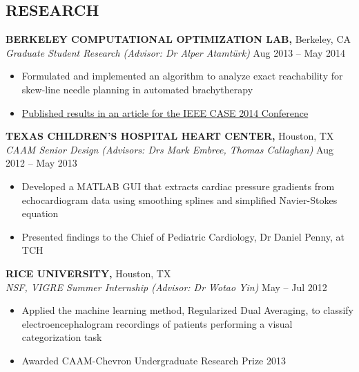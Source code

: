 \documentclass[margin]{res}
\begin{document}
\begin{resume}
\section{RESEARCH}
{\bf BERKELEY COMPUTATIONAL OPTIMIZATION LAB,} Berkeley, CA \\
{\em Graduate Student Research (Advisor: Dr Alper Atamt\"urk)} \hfill
Aug 2013 -- May 2014 \\                                          \vspace{-4mm}
\begin{itemize}                                         \itemsep1pt %
        \item    Formulated and implemented an algorithm to analyze exact reachability for skew-line needle planning in automated brachytherapy
        \item    \href{http://www.decf.berkeley.edu/~gyang/paper2014.pdf}{Published results in an article for the IEEE CASE 2014 Conference}
\end{itemize}
\vspace{-2mm}

{\bf TEXAS CHILDREN'S HOSPITAL HEART CENTER,} Houston, TX \\
{\em CAAM Senior Design (Advisors: Drs Mark Embree, Thomas Callaghan)} \hfill
Aug 2012 -- May 2013 \\                                          \vspace{-4mm}
\begin{itemize}                                         \itemsep1pt %
        \item  Developed a MATLAB GUI that extracts cardiac pressure gradients from echocardiogram data using smoothing splines and simplified Navier-Stokes equation 
        \item  Presented findings to the Chief of Pediatric Cardiology, Dr Daniel Penny, at TCH
\end{itemize}
\vspace{-2mm}

{\bf RICE UNIVERSITY,} Houston, TX \\
{\em NSF, VIGRE Summer Internship (Advisor: Dr Wotao Yin)}    \hfill
May -- Jul 2012 \\                                          \vspace{-4mm}
\begin{itemize}                                         \itemsep1pt 
        \item  Applied the machine learning method, Regularized Dual Averaging, to classify electroencephalogram  recordings of patients performing a visual categorization task
        \item Awarded CAAM-Chevron Undergraduate Research Prize
2013\end{itemize}
\vspace{-2mm}


\end{resume}
\end{document}
